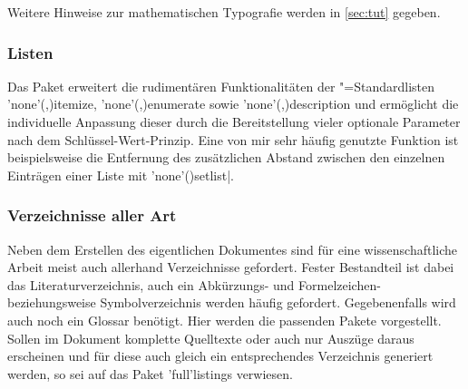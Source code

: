 Weitere Hinweise zur mathematischen Typografie werden in \autoref{sec:tut} 
gegeben.%
%



\subsubsection{%
  Listen%
}

\begin{DeclarePackages}
  Das Paket  erweitert die rudimentären Funktionalitäten der 
  "=Standardlisten
  \Environment'none'(,){itemize},
  \Environment'none'(,){enumerate} sowie
  \Environment'none'(,){description} und
  ermöglicht die individuelle Anpassung dieser durch die Bereitstellung vieler 
  optionale Parameter nach dem Schlüssel-Wert-Prinzip. Eine von mir sehr 
  häufig genutzte Funktion ist beispielsweise die Entfernung des zusätzlichen 
  Abstand zwischen den einzelnen Einträgen einer Liste mit 
  \Macro'none'(){setlist|}.
\end{DeclarePackages}



\subsubsection{%
  Verzeichnisse aller Art%
}

Neben dem Erstellen des eigentlichen Dokumentes sind für eine wissenschaftliche 
Arbeit meist auch allerhand Verzeichnisse gefordert. Fester Bestandteil ist 
dabei das Literaturverzeichnis, auch ein Abkürzungs- und Formelzeichen- 
beziehungsweise Symbolverzeichnis werden häufig gefordert. Gegebenenfalls wird 
auch noch ein Glossar benötigt. Hier werden die passenden Pakete vorgestellt. 
Sollen im Dokument komplette Quelltexte oder auch nur Auszüge daraus erscheinen 
und für diese auch gleich ein entsprechendes Verzeichnis generiert werden, so 
sei auf das Paket \Package'full'{listings} verwiesen.

